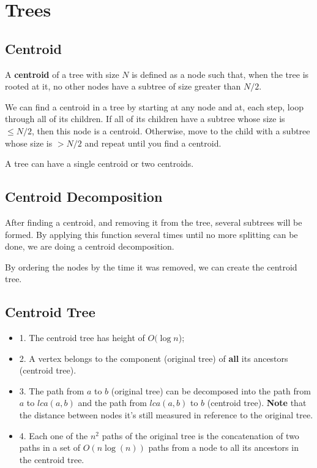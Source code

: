 
\section{Trees}


\subsection{Centroid}

A \textbf{centroid} of a tree with size $N$ is defined as a node such that, when the tree is rooted
at it, no other nodes have a subtree of size greater than $N/2$.

We can find a centroid in a tree by starting at any node and at, each step, 
loop through all of its children. 
If all of its children have a subtree whose size is $ \leq N/2$, then this node is a centroid. 
Otherwise, move to the child with a subtree whose size is $> N/2$ 
and repeat until you find a centroid.

A tree can have a single centroid or two centroids.


\vspace{5pt}

\subsection{Centroid Decomposition}

After finding a centroid, and removing it from the tree, several subtrees will be formed.
By applying this function several times until no more splitting can be done,
we are doing a centroid decomposition. 

By ordering the nodes by the time it was removed, we can create the centroid tree.

\subsection{Centroid Tree}

\vspace{5pt}

\begin{itemize}
	\item 1. The centroid tree has height of $O(\log{n}$);

	\item 2. A vertex belongs to the component (original tree) of \textbf{all} its ancestors (centroid tree).
	
	\item 3. The path from $a$ to $b$ (original tree) can be decomposed into the path from $a$ to $lca(a,b)$ 
	and the path from $lca(a,b)$ to $b$ (centroid tree).
	\textbf{Note} that the distance between nodes it's still measured in reference to the original tree.
	
	\item 4. Each one of the $n^2$ paths of the original tree is the concatenation of 
	two paths in a set of $O(n \log(n))$ paths from a node to all its ancestors in the 
	centroid tree.
\end{itemize}

